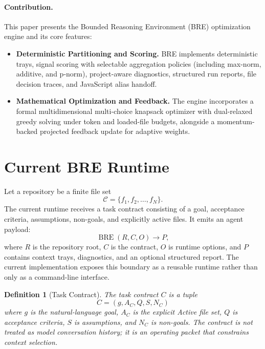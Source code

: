 \documentclass[11pt,onecolumn]{article}
\newtheorem{definition}{Definition}
\begin{document}
\paragraph{Contribution.}
This paper presents the Bounded Reasoning Environment (BRE) optimization engine and its core features:
\begin{itemize}
    \item \textbf{Deterministic Partitioning and Scoring.} BRE implements deterministic trays, signal scoring with selectable aggregation policies (including max-norm, additive, and p-norm), project-aware diagnostics, structured run reports, file decision traces, and JavaScript alias handoff.
    \item \textbf{Mathematical Optimization and Feedback.} The engine incorporates a formal multidimensional multi-choice knapsack optimizer with dual-relaxed greedy solving under token and loaded-file budgets, alongside a momentum-backed projected feedback update for adaptive weights.
\end{itemize}

\section{Current BRE Runtime}
Let a repository be a finite file set
\begin{equation}
\mathcal{C} = \{f_1, f_2, \dots, f_N\}.
\end{equation}
The current runtime receives a task contract consisting of a goal, acceptance criteria, assumptions, non-goals, and explicitly active files. It emits an agent payload:
\begin{equation}
\operatorname{BRE}(R, C, O) \rightarrow P,
\end{equation}
where $R$ is the repository root, $C$ is the contract, $O$ is runtime options, and $P$ contains context trays, diagnostics, and an optional structured report. The current implementation exposes this boundary as a reusable runtime rather than only as a command-line interface.

\begin{definition}[Task Contract]
The task contract $C$ is a tuple
\begin{equation}
C = (g, A_C, Q, S, N_C)
\end{equation}
where $g$ is the natural-language goal, $A_C$ is the explicit Active file set, $Q$ is acceptance criteria, $S$ is assumptions, and $N_C$ is non-goals. The contract is not treated as model conversation history; it is an operating packet that constrains context selection.
\end{definition}
\end{document}
